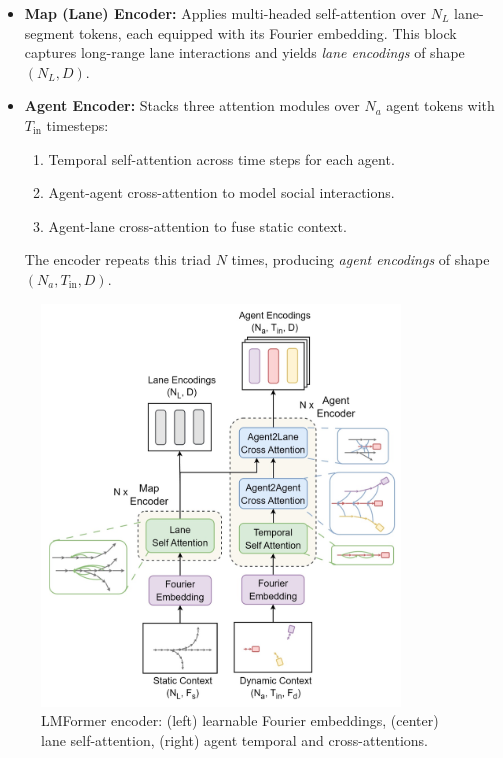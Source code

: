 \begin{itemize}[leftmargin=*]
  \item \textbf{Map (Lane) Encoder:}
        Applies multi-headed self-attention over \(N_L\) lane-segment tokens, each equipped with its Fourier embedding. This block captures long-range lane interactions and yields \emph{lane encodings} of shape \((N_L, D)\).
  \item \textbf{Agent Encoder:}
        Stacks three attention modules over \(N_a\) agent tokens with \(T_{\text{in}}\) timesteps:
        \begin{enumerate}
          \item Temporal self-attention across time steps for each agent.
          \item Agent-agent cross-attention to model social interactions.
          \item Agent-lane cross-attention to fuse static context.
        \end{enumerate}
        The encoder repeats this triad \(N\) times, producing \emph{agent encodings} of shape \((N_a, T_{\text{in}}, D)\).
\end{itemize}

\begin{figure}[ht]
  \centering
  \includegraphics[width=0.85\textwidth]{figures/lmformer_arch_encorder.png}
  \caption{LMFormer encoder: (left) learnable Fourier embeddings, (center) lane self-attention, (right) agent temporal and cross-attentions.}
  \label{fig:lmformer_arch_encoder}
\end{figure}


